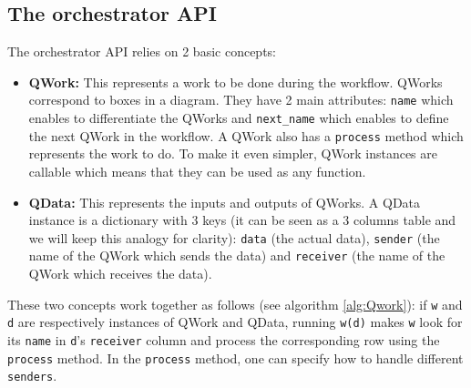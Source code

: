 \documentclass[10pt, conference, compsocconf]{IEEEtran}
\begin{document}
\subsection{The orchestrator API}
The orchestrator API relies on 2 basic concepts:
\begin{itemize}
\item \textbf{QWork:} This represents a work to be done during the workflow. QWorks correspond to boxes in a diagram. They have 2 main attributes: \texttt{name} which enables to differentiate the QWorks and \texttt{next\_name} which enables to define the next QWork in the workflow. A QWork also has a \texttt{process} method which represents the work to do. To make it even simpler, QWork instances are callable which means that they can be used as any function. 
\item \textbf{QData:} This represents the inputs and outputs of QWorks. A QData instance is a dictionary with 3 keys (it can be seen as a 3 columns table and we will keep this analogy for clarity): \texttt{data} (the actual data), \texttt{sender} (the name of the QWork which sends the data) and \texttt{receiver} (the name of the QWork which receives the data). 
\end{itemize}
These two concepts work together as follows (see algorithm \ref{alg:Qwork}): if \texttt{w} and \texttt{d} are respectively instances of QWork and QData, running \texttt{w(d)} makes \texttt{w} look for its \texttt{name} in \texttt{d}'s \texttt{receiver} column and process the corresponding row using the \texttt{process} method. In the \texttt{process} method, one can specify how to handle different \texttt{senders}.
\end{document}
